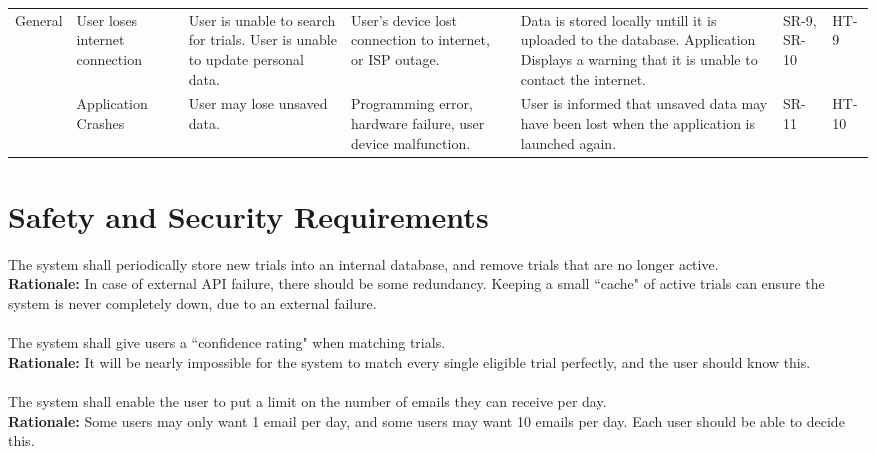 \documentclass{article}
\begin{document}
\begin{table}[H]
{\begin{tabular}{|p{3cm}|p{3cm}p{3cm}p{3cm}p{3cm}p{3cm}p{3cm}|}
      \hline
      General                                  & User loses internet connection                                                & User is unable to search for trials. User is unable to update personal data.                                          & User's device lost connection to internet, or ISP outage.                                        & Data is stored locally untill it is uploaded to the database. Application Displays a warning that it is unable to contact the internet.                        & SR-9, SR-10       & HT-9   \\\cline{2-7}
                                               & Application Crashes                                                           & User may lose unsaved data.                                                                                           & Programming error, hardware failure, user device malfunction.                                    & User is informed that unsaved data may have been lost when the application is launched again.                                                                  & SR-11             & HT-10  \\
      \hline
    \end{tabular}}
\end{table}


\section{Safety and Security Requirements}

The system shall periodically store new trials into an internal database, and remove trials that are no longer active.\\
\textbf{Rationale:}
In case of external API failure, there should be some redundancy. Keeping a small ``cache" of active trials can ensure the system is never
completely down, due to an external failure.\\~\\

The system shall give users a ``confidence rating" when matching trials.\\
\textbf{Rationale:}
It will be nearly impossible for the system to match every single eligible trial perfectly, and the user should know this.\\~\\

The system shall enable the user to put a limit on the number of emails they can receive per day.\\
\textbf{Rationale:}
Some users may only want 1 email per day, and some users may want 10 emails per day. Each user should be able to decide this.\\~\\
\end{document}
